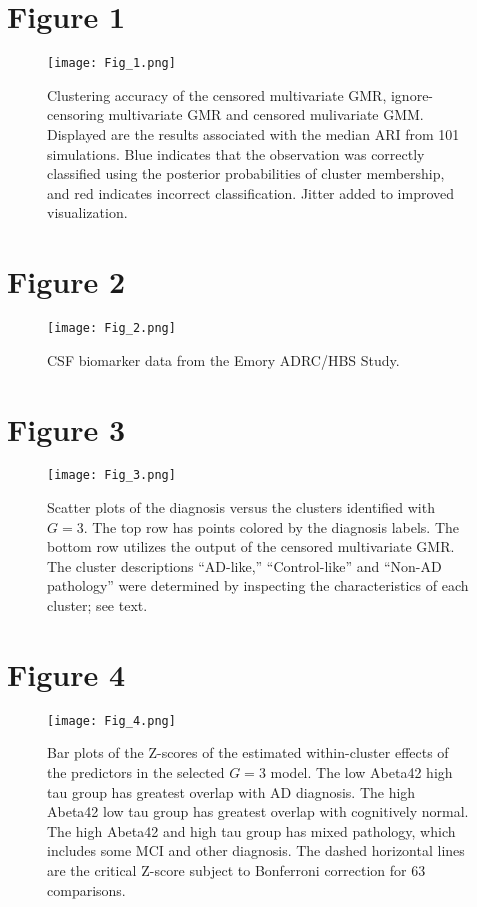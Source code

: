 \documentclass{interact}
\theoremstyle{plain}
\theoremstyle{definition}
\theoremstyle{remark}
\begin{document}
\section*{Figure 1}
\begin{figure}[H]
    \centering
    \texttt{[image: Fig\_1.png]}
    \caption{Clustering accuracy of the censored multivariate GMR, ignore-censoring multivariate GMR and censored mulivariate GMM. Displayed are the results associated with the median ARI from 101 simulations. Blue indicates that the observation was correctly classified using the posterior probabilities of cluster membership, and red indicates incorrect classification. Jitter added to improved visualization.}
    \label{fig:simfig}
\end{figure}
\pagebreak

\section*{Figure 2}

\begin{figure}[H]
    \centering
    \texttt{[image: Fig\_2.png]}
    \caption{CSF biomarker data from the Emory ADRC/HBS Study.}
    \label{fig:00}
\end{figure}
\pagebreak

\section*{Figure 3}
\begin{figure}[H]
    \centering
    \texttt{[image: Fig\_3.png]}
    \caption{Scatter plots of the diagnosis versus the clusters identified with $G=3$. The top row has points colored by the diagnosis labels. The bottom row utilizes the output of the censored multivariate GMR. The cluster descriptions ``AD-like,'' ``Control-like'' and ``Non-AD pathology'' were determined by inspecting the characteristics of each cluster; see text.}\label{real_scatter} 
\end{figure}
\pagebreak

\section*{Figure 4}

\begin{figure}[H]
    \centering
    \texttt{[image: Fig\_4.png]}
    \caption{Bar plots of the Z-scores of the estimated within-cluster effects of the predictors in the selected $G=3$ model. The low Abeta42 high tau group has greatest overlap with AD diagnosis. The high Abeta42 low tau group has greatest overlap with cognitively normal. The high Abeta42 and high tau group has mixed pathology, which includes some MCI and other diagnosis. The dashed horizontal lines are the critical Z-score subject to Bonferroni correction for 63 comparisons.}\label{real_zscore}
\end{figure}
\end{document}
